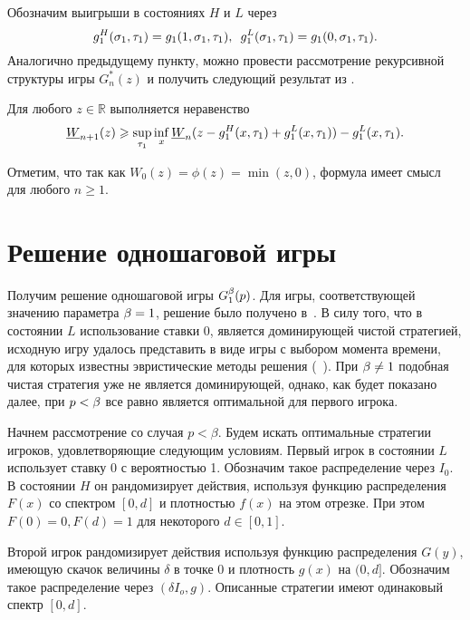 {Обозначим выигрыши в состояниях $H$ и $L$ через
\begin{equation*}
 g^H_1(\sigma_1, \tau_1) = g_1(1, \sigma_1, \tau_1), \enskip g^L_1(\sigma_1, \tau_1) = g_1(0, \sigma_1, \tau_1).
\end{equation*}
Аналогично предыдущему пункту, можно провести рассмотрение рекурсивной структуры игры $G^*_n(z)$ и получить следующий результат из \cite{demeyer02}.
\begin{lemma}\label{ch3:lem:low-bound-dual:general}
  Для любого $z \in \mathbb{R}$ выполняется неравенство
  \begin{equation}\label{ch3:eq:low-bound-dual:general}
    \LW{n+1}(z) \geqslant \sup_{\tau_1} \inf_x
    \LW{n}(z - g^H_1(x, \tau_1) + g_1^L(x, \tau_1)) - g^L_1(x, \tau_1).
  \end{equation}
\end{lemma}
Отметим, что так как $W_0(z) = \phi(z) = \min(z, 0)$, формула имеет смысл для любого $n \geqslant 1$.

\section{Решение одношаговой игры}
\label{ch3:sec:1st}

Получим решение одношаговой игры $G^{\beta}_1(p)$.
Для игры, соответствующей значению параметра $\beta = 1$, решение было получено в~\cite{sandomirskaya12}.
В силу того, что в состоянии $L$ использование ставки $0$, является доминирующей чистой стратегией, исходную игру удалось представить в виде игры с выбором момента времени, для которых известны эвристические методы решения (\seename~\cite{karlin64}).
При $\beta \neq 1$ подобная чистая стратегия уже не является доминирующей, однако, как будет показано далее, при $p < \beta$ все равно является оптимальной для первого игрока.

Начнем рассмотрение со случая $p < \beta$.
Будем искать оптимальные стратегии игроков, удовлетворяющие следующим условиям.
Первый игрок в состоянии $L$ использует ставку $0$ с вероятностью 1.
Обозначим такое распределение через $I_0$.
В состоянии $H$ он рандомизирует действия, используя функцию распределения $F(x)$ со спектром $[0, d]$ и плотностью $f(x)$ на этом отрезке. При этом $F(0) = 0, F(d) = 1$ для некоторого $d \in [0, 1]$.

Второй игрок рандомизирует действия используя функцию распределения $G(y)$, имеющую скачок величины $\delta$ в точке $0$ и плотность $g(x)$ на $(0, d]$.
Обозначим такое распределение через $(\delta I_o, g)$.
Описанные стратегии имеют одинаковый спектр $[0, d]$.

}
